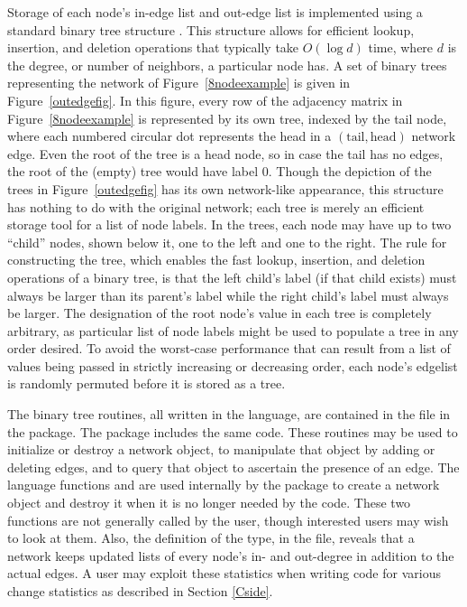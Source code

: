 \documentclass[nojss]{jss}
\begin{document}
Storage of each node's in-edge list and out-edge list is implemented using a
standard binary tree structure \citep[Chapter 13]{algorithms}. This 
structure allows for efficient lookup, insertion, and deletion operations that
typically take $O(\log d)$ time, where $d$ is the degree, or number of
neighbors, a particular node has. A set of binary trees representing the network of
Figure~\ref{8nodeexample} is given in Figure~\ref{outedgefig}. 
In this figure, every row of the adjacency matrix in Figure~\ref{8nodeexample}
is represented by its own tree, indexed by the tail node, where each numbered 
circular dot represents the head in a $(\mbox{tail}, \mbox{head})$ network edge.
Even the root of the tree is a head node, so in case the tail has no edges, the
root of the (empty) tree would have label 0.
Though the depiction of the trees in Figure~\ref{outedgefig} has its own network-like
appearance, this structure has nothing to do with the original network;
each tree is merely an efficient storage tool for a list of node labels.  In the trees,
each node may have up to two 
``child'' nodes, shown below it, one to the left and one to the right.
The rule for constructing the tree, which enables the fast lookup, insertion, and
deletion operations of a binary tree,
 is that the left child's label (if that child exists)
 must always be larger than its parent's label while the
 right child's label must always be larger.
The designation of the root node's value in each tree is completely 
arbitrary, as particular list of node labels might be used to populate
a tree in any order desired.
To avoid the worst-case performance that can result from a list
of values being passed in strictly increasing or decreasing order, each node's
edgelist is randomly permuted before it is stored as a tree.

The binary tree routines, all written in the  language, are contained in the
 file in the  package. The  package
includes the same code.  These routines may be used to initialize or destroy
a network object, to manipulate that object by adding or deleting edges, and to
query that object to ascertain the presence of an edge.
The  language functions  and  
are used internally by the  package to create a network object
and destroy it when it is no longer needed by the  code.  
These two functions
are not generally called by the user, though interested users may wish
to look at them.  Also, the definition of the  type, in the
 file, reveals that a network keeps updated lists of every node's
in- and out-degree in addition to the actual edges.  A user may exploit these statistics
when writing code for various change statistics as described in Section \ref{Cside}.
\end{document}
